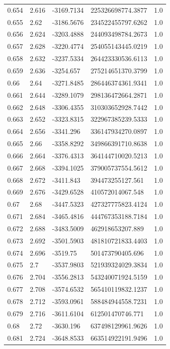 \begin{tabular}{lllll}
0.654 & 2.616 & -3169.7134 & 225326698774.3877 & 1.0 \\
0.655 & 2.62 & -3186.5676 & 234522455797.6262 & 1.0 \\
0.656 & 2.624 & -3203.4888 & 244093498784.2673 & 1.0 \\
0.657 & 2.628 & -3220.4774 & 254055143445.0219 & 1.0 \\
0.658 & 2.632 & -3237.5334 & 264423330536.6113 & 1.0 \\
0.659 & 2.636 & -3254.657 & 275214651370.3799 & 1.0 \\
0.66 & 2.64 & -3271.8485 & 286446374361.9341 & 1.0 \\
0.661 & 2.644 & -3289.1079 & 298136472664.2871 & 1.0 \\
0.662 & 2.648 & -3306.4355 & 310303652928.7442 & 1.0 \\
0.663 & 2.652 & -3323.8315 & 322967385239.5333 & 1.0 \\
0.664 & 2.656 & -3341.296 & 336147934270.0897 & 1.0 \\
0.665 & 2.66 & -3358.8292 & 349866391710.8638 & 1.0 \\
0.666 & 2.664 & -3376.4313 & 364144710020.5213 & 1.0 \\
0.667 & 2.668 & -3394.1025 & 379005737554.5612 & 1.0 \\
0.668 & 2.672 & -3411.843 & 394473255127.561 & 1.0 \\
0.669 & 2.676 & -3429.6528 & 410572014067.548 & 1.0 \\
0.67 & 2.68 & -3447.5323 & 427327775823.4124 & 1.0 \\
0.671 & 2.684 & -3465.4816 & 444767353188.7184 & 1.0 \\
0.672 & 2.688 & -3483.5009 & 462918653207.889 & 1.0 \\
0.673 & 2.692 & -3501.5903 & 481810721833.4403 & 1.0 \\
0.674 & 2.696 & -3519.75 & 501473790405.696 & 1.0 \\
0.675 & 2.7 & -3537.9803 & 521939324029.3834 & 1.0 \\
0.676 & 2.704 & -3556.2813 & 543240071924.5159 & 1.0 \\
0.677 & 2.708 & -3574.6532 & 565410119832.1237 & 1.0 \\
0.678 & 2.712 & -3593.0961 & 588484944558.7231 & 1.0 \\
0.679 & 2.716 & -3611.6104 & 612501470746.771 & 1.0 \\
0.68 & 2.72 & -3630.196 & 637498129961.9626 & 1.0 \\
0.681 & 2.724 & -3648.8533 & 663514922191.9496 & 1.0 \\

\end{tabular}
